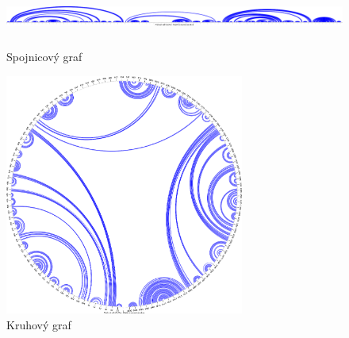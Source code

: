 \begin{figure}
  \includegraphics[width=1\textwidth, height=2cm]{../img/human-linear}
  \caption{Spojnicový graf}
  \label{obr:human_linked}
\end{figure}

\begin{figure}
  \centering
  \includegraphics[width=0.7\textwidth]{../img/human-circular}
  \caption{Kruhový graf}
  \label{obr:human_circular}
\end{figure}

